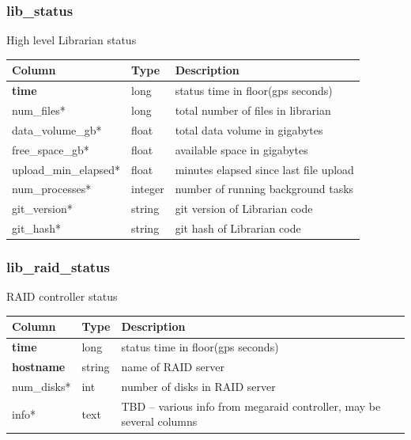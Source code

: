 \documentclass{article}
\begin{document}
{\subsubsection{lib\_status}
High level Librarian status
\begin{center}
 \begin{tabular}{| p{4cm} | p{2cm} | p{10cm} |}
\hline
 {\bf Column} & {\bf Type}  & {\bf Description} \\ [0.5ex]  \hline\hline
\textbf{time} & long & status time in floor(gps seconds) \\ \hline
num\_files* & long & total number of files in librarian  \\\hline
data\_volume\_gb* & float & total data volume in gigabytes  \\\hline
free\_space\_gb* & float & available space in gigabytes  \\\hline
upload\_min\_elapsed* & float & minutes elapsed since last file upload \\\hline
num\_processes* & integer & number of running background tasks  \\\hline
git\_version* & string & git version of Librarian code  \\\hline
git\_hash* & string & git hash of Librarian code  \\\hline
\end{tabular}
\end{center}

\subsubsection{lib\_raid\_status}
RAID controller status
\begin{center}
 \begin{tabular}{| p{4cm} | p{2cm} | p{10cm} |}
\hline
 {\bf Column} & {\bf Type}  & {\bf Description} \\ [0.5ex]  \hline\hline
\textbf{time} & long & status time in floor(gps seconds) \\ \hline
\textbf{hostname} & string & name of RAID server \\ \hline
num\_disks* & int & number of disks in RAID server  \\\hline
info* & text & TBD -- various info from megaraid controller, may be several columns \\\hline
\end{tabular}
\end{center}

}
\end{document}
